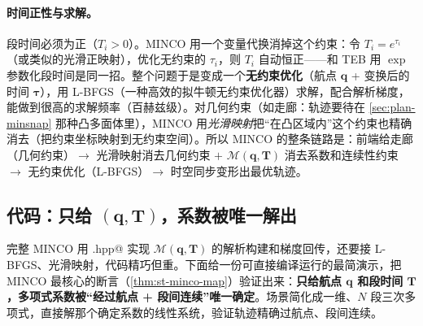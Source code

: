 \paragraph{时间正性与求解。}
段时间必须为正（$T_i>0$）。MINCO 用一个变量代换消掉这个约束：令 $T_i=e^{\tau_i}$（或类似的光滑正映射），优化无约束的 $\tau_i$，则 $T_i$ 自动恒正——和 TEB 用 $\exp$ 参数化段时间是同一招。整个问题于是变成一个\textbf{无约束优化}（航点 $\mathbf q$ + 变换后的时间 $\boldsymbol\tau$），用 L-BFGS（一种高效的拟牛顿无约束优化器）求解，配合解析梯度，能做到很高的求解频率（百赫兹级）。对几何约束（如走廊：轨迹要待在 \cref{sec:plan-minsnap} 那种凸多面体里），MINCO 用\emph{光滑映射}把“在凸区域内”这个约束也精确消去（把约束坐标映射到无约束空间）。所以 MINCO 的整条链路是：前端给走廊（几何约束）$\to$ 光滑映射消去几何约束 $+$ $\mathcal M(\mathbf q,\mathbf T)$ 消去系数和连续性约束 $\to$ 无约束优化（L-BFGS）$\to$ 时空同步变形出最优轨迹。

\subsection{代码：只给\texorpdfstring{ $(\mathbf q,\mathbf T)$}{ (q,T)}，系数被唯一解出}
\label{sec:st-minco-code}

完整 MINCO 用 \verb@minco.hpp@ 实现 $\mathcal M(\mathbf q,\mathbf T)$ 的解析构建和梯度回传，还要接 L-BFGS、光滑映射，代码精巧但重。下面给一份可直接编译运行的最简演示，把 MINCO 最核心的断言（\cref{thm:st-minco-map}）验证出来：\textbf{只给航点 $\mathbf q$ 和段时间 $\mathbf T$，多项式系数被“经过航点 + 段间连续”唯一确定}。场景简化成一维、$N$ 段三次多项式，直接解那个确定系数的线性系统，验证轨迹精确过航点、段间连续。

